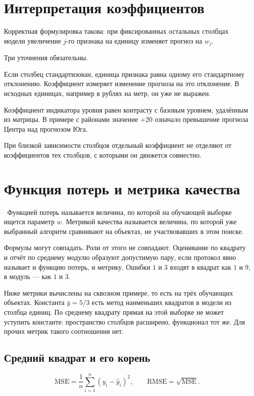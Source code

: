 \documentclass[11pt,a4paper]{article}
\newcounter{deflist}
\newcommand{\Def}[1]{\refstepcounter{deflist}\par\noindent{\color{navy}\textbf{Определение \thedeflist.}}\ #1\par}
\begin{document}
\section{Интерпретация коэффициентов}

Корректная формулировка такова: при фиксированных остальных столбцах модели увеличение \(j\)-го признака на единицу изменяет прогноз на \(w_j\).

Три уточнения обязательны.

Если столбец стандартизован, единица признака равна одному его стандартному отклонению. Коэффициент измеряет изменение прогноза на это отклонение. В исходных единицах, например в рублях на метр, он уже не выражен.

Коэффициент индикатора уровня равен контрасту с базовым уровнем, удалённым из матрицы. В примере с районами значение \(+20\) означало превышение прогноза Центра над прогнозом Юга.

При близкой зависимости столбцов отдельный коэффициент не отделяют от коэффициентов тех столбцов, с которыми он движется совместно.

\section{Функция потерь и метрика качества}

\Def{Функцией потерь называется величина, по которой на обучающей выборке ищется параметр \(w\). Метрикой качества называется величина, по которой уже выбранный алгоритм сравнивают на объектах, не участвовавших в этом поиске.}

Формулы могут совпадать. Роли от этого не совпадают. Оценивание по квадрату и отчёт по среднему модулю образуют допустимую пару, если протокол явно называет и функцию потерь, и метрику. Ошибки \(1\) и \(3\) входят в квадрат как \(1\) и \(9\), в модуль --- как \(1\) и \(3\).

Ниже метрики вычислены на сквозном примере, то есть на трёх обучающих объектах. Константа \(\bar y=5/3\) есть метод наименьших квадратов в модели из столбца единиц. По среднему квадрату прямая на этой выборке не может уступить константе: пространство столбцов расширено, функционал тот же. Для прочих метрик такого соотношения нет.

\subsection{Средний квадрат и его корень}

\[
\mathrm{MSE}=\frac1n\sum_{i=1}^{n}(y_i-\hat y_i)^{2},\qquad
\mathrm{RMSE}=\sqrt{\mathrm{MSE}}.
\]
\end{document}
